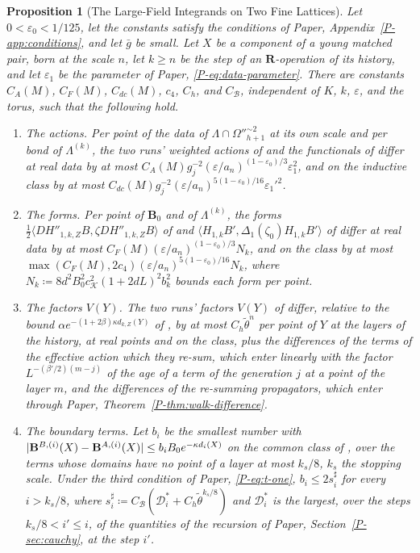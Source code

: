 \documentclass[11pt]{preprint}
\DeclarePairedDelimiter{\abs}{\lvert}{\rvert}
\numberwithin{equation}{section}
\newtheorem{proposition}{Proposition}
\theoremstyle{definition}
\theoremstyle{remark}
\theoremstyle{plain}
\begin{document}
\begin{proposition}[The Large-Field Integrands on Two Fine Lattices]\label{prop:large-field-integrands}
Let $0 < \varepsilon_0 < 1/125$, let the constants satisfy the conditions of Paper, Appendix~\ref{P-app:conditions}, and let $\bar g$ be small. Let $X$ be a component of a young matched pair, born at the scale $n$, let $k \geq n$ be the step of an $\mathbf R$-operation of its history, and let $\varepsilon_1$ be the parameter of Paper, \eqref{P-eq:data-parameter}. There are constants $C_A(M)$, $C_F(M)$, $C_{dc}(M)$, $c_4$, $C_h$, and $C_{\mathcal B}$, independent of $K$, $k$, $\varepsilon$, and the torus, such that the following hold.
\begin{enumerate}[label=(\alph*)]
\item \emph{The actions.} Per point of the data of $\Lambda \cap \Omega''^{\sim2}_{h+1}$ at its own scale and per bond of $\Lambda^{(k)}$, the two runs' weighted actions of \cite[(1.70), p.~377]{BalabanLFR2} and the functionals of \cite[(1.3), p.~357]{BalabanLFR2} differ at real data by at most $C_A(M)g_j^{-2}(\varepsilon/a_n)^{(1-\varepsilon_0)/3}\varepsilon_1^2$, and on the inductive class by at most $C_{dc}(M)g_j^{-2}(\varepsilon/a_n)^{5(1-\varepsilon_0)/16}\varepsilon_1'^2$.
\item \emph{The forms.} Per point of $\mathbf B_0$ and of $\Lambda^{(k)}$, the forms $\frac12\langle DH''_{1,k,Z}B, \zeta DH''_{1,k,Z}B\rangle$ of \cite[(1.70)]{BalabanLFR2} and $\langle H_{1,k}B', \Delta_1(\zeta_0)H_{1,k}B'\rangle$ of \cite[(1.2), p.~356]{BalabanLFR2} differ at real data by at most $C_F(M)(\varepsilon/a_n)^{(1-\varepsilon_0)/3}N_k$, and on the class by at most $\max(C_F(M), 2c_4)(\varepsilon/a_n)^{5(1-\varepsilon_0)/16}N_k$, where $N_k \coloneqq 8d^2B_0^2c_{\mathcal K}^2(1 + 2dL)^2b_k^2$ bounds each form per point.
\item \emph{The factors $V(Y)$.} The two runs' factors $V(Y)$ of \cite[(1.68), (1.91)]{BalabanLFR2} differ, relative to the bound $\alpha e^{-(1+2\beta)\kappa d_{k,Z}(Y)}$ of \cite[(1.68)]{BalabanLFR2}, by at most $C_h\tilde\theta^n$ per point of $Y$ at the layers of the history, at real points and on the class, plus the differences of the terms of the effective action which they re-sum, which enter linearly with the factor $L^{-(\beta'/2)(m-j)}$ of the age of a term of the generation $j$ at a point of the layer $m$, and the differences of the re-summing propagators, which enter through Paper, Theorem~\ref{P-thm:walk-difference}.
\item \emph{The boundary terms.} Let $b_i$ be the smallest number with $\abs{\mathbf B^{B,(i)}(X) - \mathbf B^{A,(i)}(X)} \leq b_iB_0e^{-\kappa d_i(X)}$ on the common class of \cite[(2.40)--(2.42), p.~261]{BalabanCRE}, over the terms whose domains have no point of a layer at most $k_s/8$, $k_s$ the stopping scale. Under the third condition of Paper, \eqref{P-eq:t-one}, $b_i \leq 2s^\sharp_i$ for every $i > k_s/8$, where $s^\sharp_i \coloneqq C_{\mathcal B}(\mathcal D^*_i + C_h\tilde\theta^{k_s/8})$ and $\mathcal D^*_i$ is the largest, over the steps $k_s/8 < i' \leq i$, of the quantities of the recursion of Paper, Section~\ref{P-sec:cauchy}, at the step $i'$.

\end{enumerate}
\end{proposition}
\end{document}
